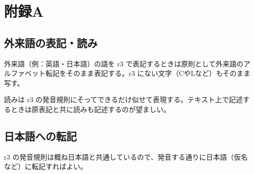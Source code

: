 \section{附録A}

\subsection{外来語の表記・読み}

外来語（例：英語・日本語）の語を r3 で表記するときは原則として外来語のアルファベット転記をそのまま表記する。r3 にない文字（CやLなど）もそのまま写す。

読みは r3 の発音規則にそってできるだけ似せて表現する。テキスト上で記述するときは原表記と共に読みも記述するのが望ましい。

\subsection{日本語への転記}

r3 の発音規則は概ね日本語と共通しているので、発音する通りに日本語（仮名など）に転記すればよい。
